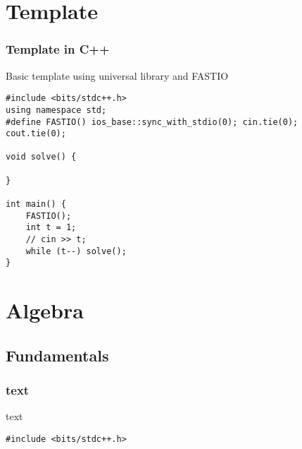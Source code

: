\section{Template}
\subsubsection*{Template in C++ }
Basic template using universal library and FASTIO

\begin{lstlisting}
#include <bits/stdc++.h>
using namespace std;
#define FASTIO() ios_base::sync_with_stdio(0); cin.tie(0); cout.tie(0);

void solve() {
    
}
 
int main() {
    FASTIO();
    int t = 1;
    // cin >> t;
    while (t--) solve();
}   
\end{lstlisting}

\section{Algebra}
\subsection{Fundamentals}
\subsubsection*{text }
text

\begin{lstlisting}
#include <bits/stdc++.h>
\end{lstlisting}

